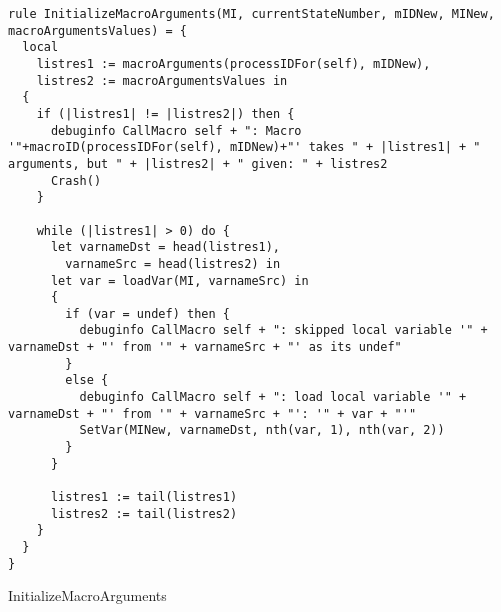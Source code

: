 \begin{listing}[H]
\begin{verbatim}
rule InitializeMacroArguments(MI, currentStateNumber, mIDNew, MINew, macroArgumentsValues) = {
  local
    listres1 := macroArguments(processIDFor(self), mIDNew),
    listres2 := macroArgumentsValues in
  {
    if (|listres1| != |listres2|) then {
      debuginfo CallMacro self + ": Macro '"+macroID(processIDFor(self), mIDNew)+"' takes " + |listres1| + " arguments, but " + |listres2| + " given: " + listres2
      Crash()
    }

    while (|listres1| > 0) do {
      let varnameDst = head(listres1),
        varnameSrc = head(listres2) in
      let var = loadVar(MI, varnameSrc) in
      {
        if (var = undef) then {
          debuginfo CallMacro self + ": skipped local variable '" + varnameDst + "' from '" + varnameSrc + "' as its undef"
        }
        else {
          debuginfo CallMacro self + ": load local variable '" + varnameDst + "' from '" + varnameSrc + "': '" + var + "'"
          SetVar(MINew, varnameDst, nth(var, 1), nth(var, 2))
        }
      }

      listres1 := tail(listres1)
      listres2 := tail(listres2)
    }
  }
}
\end{verbatim}
\caption{InitializeMacroArguments}
\label{lst:asm:InitializeMacroArguments}
\end{listing}





